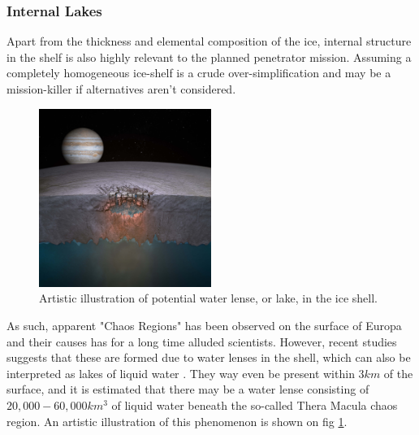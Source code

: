 \subsubsection{Internal Lakes}
Apart from the thickness and elemental composition of the ice, internal structure in the shelf is also highly relevant to the planned penetrator mission. Assuming a completely homogeneous ice-shelf is a crude over-simplification and may be a mission-killer if alternatives aren't considered. 
\begin{figure}[htb]
	\centering
	\includegraphics[width=0.5\textwidth]{figures/Rasmus/ArtLake}
	\caption{Artistic illustration of potential water lense, or lake, in the ice shell. \label{fig: ArtLake}}
\end{figure}
As such, apparent "Chaos Regions" has been observed on the surface of Europa and their causes has for a long time alluded scientists. However, recent studies suggests that these are formed due to water lenses in the shell, which can also be interpreted as lakes of liquid water \cite{IceLakes}. They way even be present within $3km$ of the surface, and it is estimated that there may be a water lense consisting of $20,000 - 60,000km^3$ of liquid water beneath the so-called Thera Macula chaos region. An artistic illustration of this phenomenon is shown on fig \ref{fig: ArtLake}.

\label{sec:ice_losses}

